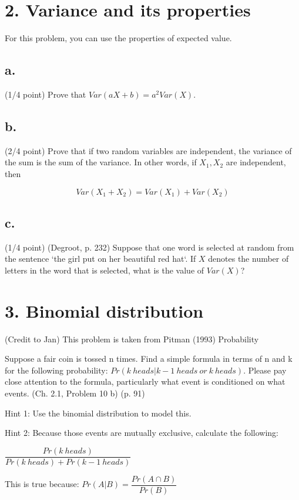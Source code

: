 \documentclass{article}\usepackage[]{graphicx}\usepackage[]{color}
\begin{document}
\section*{2. Variance and its properties}

For this problem, you can use the properties of expected value.

\subsection*{a.} (1/4 point) Prove that $Var(aX + b) = a^2 Var(X)$.

\subsection*{b.} (2/4 point) Prove that if two random variables are independent, the variance of the sum is the sum of the variance. In other words, if $X_1, X_2$ are independent, then

$$Var(X_1 + X_2) = Var(X_1) + Var(X_2)$$

\subsection*{c.} (1/4 point) (Degroot, p. 232) Suppose that one word is selected at random from the sentence `the girl put on her beautiful red hat`. If $X$ denotes the number of letters in the word that is selected, what is the value of $Var(X)$?


\section*{3. Binomial distribution}

(Credit to Jan) This problem is taken from Pitman (1993) Probability

Suppose a fair coin is tossed n times. Find a simple formula in terms of n and k for the following probability: $Pr(k\ heads | k-1\ heads\ or\ k\ heads)$. Please pay close attention to the formula, particularly what event is conditioned on what events. (Ch. 2.1, Problem 10 b) (p. 91)

Hint 1: Use the binomial distribution to model this.

Hint 2: Because those events are mutually exclusive, calculate the following:

$\dfrac{Pr(k\ heads)}{Pr (k\ heads) + Pr (k-1\ heads)}$

This is true because: $Pr(A | B) = \dfrac{Pr (A \cap B)}{Pr (B)}$
\end{document}
